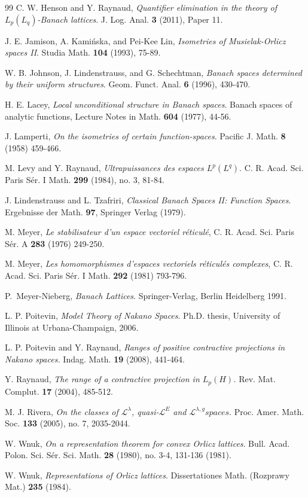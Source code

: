 \documentclass[11pt]{amsart}
\theoremstyle{plain}
\theoremstyle{remark}
\begin{document}
\begin{thebibliography}{99}
 C. W. Henson and Y. Raynaud, {\it Quantifier elimination in the theory of $L_p(L_q)$-Banach lattices}. J. Log. Anal. {\bf 3} (2011), Paper 11.

  J. E. Jamison, A. Kami\'nska, and Pei-Kee Lin, {\it Isometries of Musielak-Orlicz spaces II}.  Studia Math. {\bf 104} (1993),  75-89.

  W. B. Johnson, J. Lindenstrauss, and G. Schechtman, {\it Banach spaces determined by their uniform structures}. Geom. Funct. Anal. {\bf 6} (1996), 430-470.

 H. E. Lacey, {\it Local unconditional structure in Banach spaces}. Banach spaces of analytic functions, Lecture Notes in Math. {\bf 604} (1977), 44-56.

 J. Lamperti, {\it On the isometries of certain function-spaces}. Pacific J. Math. {\bf 8} (1958) 459-466. 

  M. Levy and Y. Raynaud,  {\it Ultrapuissances des espaces $L^p(L^q)$}.  C. R. Acad. Sci. Paris S\'er. I Math. {\bf 299} (1984), no. 3, 81-84. 

 J. Lindenstrauss and L. Tzafriri, {\it Classical Banach Spaces II: Function
Spaces}. Ergebnisse der Math. {\bf 97}, Springer Verlag (1979).

 M. Meyer, {\it Le stabilisateur d'un espace vectoriel r\'eticul\'e}, C. R. Acad. Sci. Paris S\'er. A {\bf 283} (1976) 249-250.

 M. Meyer, {\it Les homomorphismes d'espaces vectoriels r\'eticul\'es complexes}, C. R. Acad. Sci. Paris S\'er. I Math. {\bf 292} (1981) 793-796.

 P.~Meyer-Nieberg, \emph{Banach Lattices}. Springer-Verlag, Berlin Heidelberg 1991.

  L. P. Poitevin,  \emph{ Model Theory of Nakano Spaces}. Ph.D. thesis, University of Illinois at Urbana-Champaign, 2006.

  L. P. Poitevin and Y. Raynaud, {\it Ranges of positive contractive projections in Nakano spaces.}  Indag. Math. {\bf 19} (2008), 441-464.

  Y. Raynaud, {\it The range of a contractive projection in $L_p(H)$.}  Rev. Mat.
Complut. {\bf 17} (2004), 485-512.

 M. J. Rivera, {\it On the classes of $\mathcal L^\lambda$, quasi-$\mathcal L^E$ and $\mathcal L^{\lambda,g} spaces$}. Proc. Amer. Math. Soc. {\bf 133} (2005), no. 7, 2035-2044.

 W. Wnuk, {\it On a representation theorem for convex Orlicz lattices}. Bull. Acad. Polon. Sci. S\'er. Sci. Math. {\bf 28} (1980), no. 3-4, 131-136 (1981).

 W. Wnuk, {\it Representations of Orlicz lattices}. Dissertationes Math. (Rozprawy Mat.) {\bf 235} (1984). 



\end{thebibliography}
\end{document}
